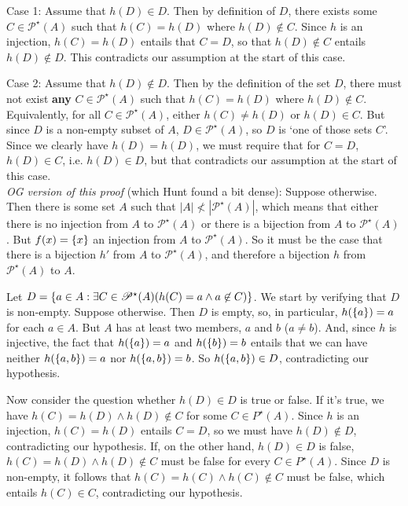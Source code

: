 \documentclass[12pt,letterpaper]{article}
\begin{document}
\begin{enumerate}
\begin{enumerate}
{Case 1: Assume that $h(D) \in D$. Then by definition of $D$, there exists some $C \in \mathscr{P}^\star(A)$ such that $h(C) = h(D)$ where $h(D) \notin C$. Since $h$ is an injection, $h(C) = h(D)$ entails that $C = D$, so that $h(D) \notin C$ entails  $h(D) \notin D$. This contradicts our assumption at the start of this case. 

Case 2: Assume that $h(D) \notin D$. Then by the definition of the set $D$, there must not exist \textbf{any} $C \in \mathscr{P}^\star(A)$ such that $h(C) = h(D)$ where $h(D) \notin C$. Equivalently, for all $C \in \mathscr{P}^\star(A)$, either $h(C) \neq h(D)$ or $h(D) \in C$. But since $D$ is a non-empty subset of $A$, $D \in  \mathscr{P}^\star(A)$, so $D$ is `one of those sets $C$'. Since we clearly have $h(D) = h(D)$, we must require that for $C = D$, $h(D) \in C$, i.e. $h(D) \in D$, but that contradicts our assumption at the start of this case. \\ [2ex]




\textit{OG version of this proof} (which Hunt found a bit dense): Suppose otherwise. Then there is some set $A$ such that $|A| \not< |\mathscr{P}^\star(A)|$, which means that either there is no injection from $A$ to $\mathscr{P}^\star(A)$ or there is a bijection from $A$  to $\mathscr{P}^\star(A)$. But $f(x) = \left\{ {x} \right\}$ an injection from $A$ to $\mathscr{P}^\star(A)$. So it must be the case that there is a bijection $h'$ from $A$ to $\mathscr{P}^\star(A)$, and therefore a bijection $h$ from $\mathscr{P}^\star(A)$ to $A$.

Let $D = \left\{ {a \in A : \exists C \in \mathscr{P}^\star(A) (h(C) = a \wedge a \not\in C)} \right\}$. We start by verifying that $D$ is non-empty. Suppose otherwise. Then $D$ is empty, so, in particular, $h(\left\{ {a} \right\}) = a$ for each $a \in A$. But $A$ has at least two members, $a$ and $b$ ($a \neq b$). And, since $h$ is injective, the fact that $h(\left\{ {a} \right\}) = a$ and $h(\left\{ {b} \right\}) = b$ entails that we can have neither $ h(\left\{ {a,b} \right\}) = a $ nor $h(\left\{ {a,b} \right\}) = b$. So $h(\left\{ {a,b} \right\}) \in D$, contradicting our hypothesis.

Now consider the question whether $h(D) \in D$ is true or false. If it's true, we have $h(C) = h(D) \wedge h(D) \not\in C$ for some $C \in \mathscr{}P^\star(A)$. Since $h$ is an injection, $h(C) = h(D)$ entails $C = D$, so we must have $h(D) \not\in D$, contradicting our hypothesis. If, on the other hand, $h(D) \in D$ is false, $h(C) = h(D) \wedge h(D) \not\in C$ must be false for every $C \in \mathscr{}P^\star(A)$. Since $D$ is non-empty, it follows that $h(C) = h(C) \wedge h(C) \not\in C$ must be false, which entails $h(C) \in C$, contradicting our hypothesis.
}

\end{enumerate}


\end{enumerate}






\end{document}
